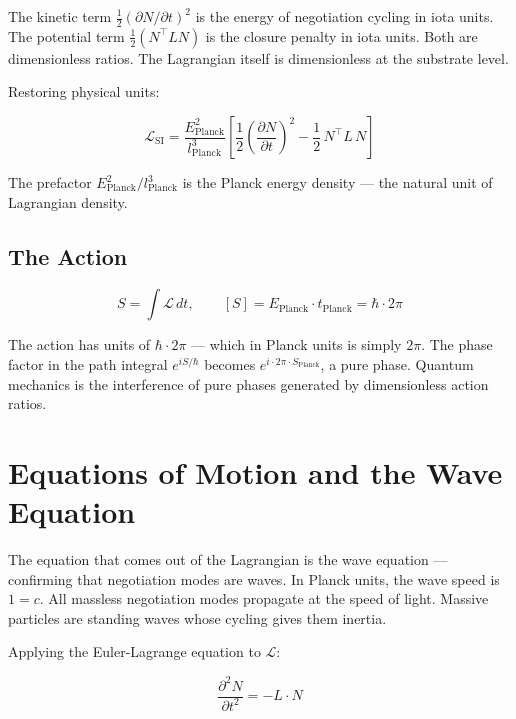 \documentclass[11pt,letterpaper]{article}
\newenvironment{plainbox}{\begin{tcolorbox}[colback=blue!3!white,colframe=blue!40!white,title={\small\textit{In plain language}},breakable]}{\end{tcolorbox}}
\begin{document}
The kinetic term \(\tfrac{1}{2}(\partial N/\partial t)^2\) is the energy of negotiation cycling in iota units. The potential term \(\tfrac{1}{2}(N^\top L N)\) is the closure penalty in iota units. Both are dimensionless ratios. The Lagrangian itself is dimensionless at the substrate level.

Restoring physical units:

\begin{equation}
\mathcal{L}_\text{SI} = \frac{E_\text{Planck}^2}{l_\text{Planck}^3}\left[\frac{1}{2}\!\left(\frac{\partial N}{\partial t}\right)^{\!2} - \frac{1}{2}\,N^\top L\, N\right]
\end{equation}

The prefactor \(E_\text{Planck}^2/l_\text{Planck}^3\) is the Planck energy density --- the natural unit of Lagrangian density.

\subsection{The Action}
\label{sec:org03c5ac4}

\begin{equation}
S = \int \mathcal{L}\, dt, \qquad [S] = E_\text{Planck} \cdot t_\text{Planck} = \hbar \cdot 2\pi
\end{equation}

The action has units of \(\hbar \cdot 2\pi\) --- which in Planck units is simply \(2\pi\). The phase factor in the path integral \(e^{iS/\hbar}\) becomes \(e^{i \cdot 2\pi \cdot S_\text{Planck}}\), a pure phase. Quantum mechanics is the interference of pure phases generated by dimensionless action ratios.

\section{Equations of Motion and the Wave Equation}
\label{sec:orga3012e2}

\begin{plainbox}
The equation that comes out of the Lagrangian is the wave equation --- confirming that negotiation modes are waves. In Planck units, the wave speed is $1 = c$. All massless negotiation modes propagate at the speed of light. Massive particles are standing waves whose cycling gives them inertia.
\end{plainbox}

Applying the Euler-Lagrange equation to \(\mathcal{L}\):

\begin{equation}
\frac{\partial^2 N}{\partial t^2} = -L \cdot N
\end{equation}
\end{document}
